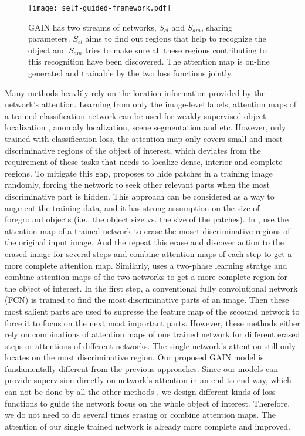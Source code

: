 \documentclass[10pt,twocolumn,letterpaper]{article}
\begin{document}
\begin{figure*}%
\centering
\texttt{[image: self-guided-framework.pdf]} %
\caption{GAIN has two streams of networks, ${S_{cl}}$ and ${S_{am}}$, sharing parameters. ${S_{cl}}$ aims to find out regions that help to recognize the object and ${S_{am}}$ tries to make sure all these regions contributing to this recognition have been discovered. The attention map is on-line generated and trainable by the two loss functions jointly.}
\label{fig:self_supervised}
\end{figure*}


Many methods heavlily rely on the location information provided by the network's attention. Learning from only the image-level labels, attention maps of a trained classification network can be used for weakly-supervised object localization \cite{zhou2016learning,oquab2015object}, anomaly localization, scene segmentation \cite{kolesnikov2016seed} and etc. However, only trained with classification loss, the attention map only covers small and most discriminative regions of the object of interest, which deviates from the requirement of these tasks that needs to localize dense, interior and complete regions. To mitigate this gap, \cite{singh2017hide} proposes to hide patches in a training image randomly, forcing the network to seek other relevant parts when the most discriminative part is hidden. This approach can be considered as a way to augment the training data, and it has strong assumption on the size of foreground objects (i.e., the object size vs. the size of the patches). In \cite{wei2017object}, use the attention map of a trained network to erase the moset discriminative regions of the original input image. And the repeat this erase and discover action to the erased image for several steps and combine attention maps of each step to get a more complete attention map. Similarly, \cite{kim2017two} uses a two-phase learning stratge and combine attention maps of the two networks to get a more complete region for the object of interest. In the first step, a conventional fully convolutional network (FCN) \cite{long2015fully} is trained to find the most discriminative parts of an image. Then these most salient parts are used to supresse the feature map of the secound network to force it to focus on the next most important parts. However, these methods either rely on combinations of attention maps of one trained network for different erased steps or attentions of different networks. The single network's attention still only locates on the most discriminative region. Our proposed GAIN model is fundamentally different from the previous approaches. Since our models can provide supervision directly on network's attention in an end-to-end way, which can not be done by all the other methods \cite{grad-cam,zhou2016learning,wei2017object,zhang2016top,singh2017hide,kim2017two}, we design different kinds of loss functions to guide the network focus on the whole object of interest. Therefore, we do not need to do several times erasing or combine attention maps. The attention of our single trained network is already more complete and improved.
\end{document}
